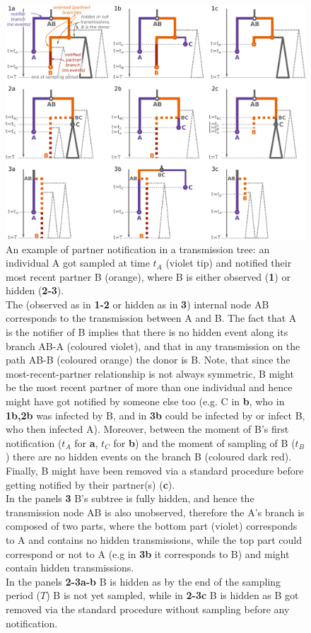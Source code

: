 \documentclass[a4paper,10pt]{article}
\begin{document}
\begin{figure}[tbhp]
\centering 
\includegraphics[width=1\textwidth]{Fig_PNbranches}
\caption{An example of partner notification in a transmission tree: an individual A got sampled at time $t_A$ (violet tip) and notified their most recent partner B (orange), where B is either observed (\textbf{1}) or hidden (\textbf{2-3}). \\
The (observed as in \textbf{1-2} or hidden as in \textbf{3}) internal node AB corresponds to the transmission between A and B. The fact that A is the notifier of B implies that there is no hidden event along its branch AB-A (coloured violet), and that in any transmission on the path AB-B (coloured orange) the donor is B. Note, that since the most-recent-partner relationship is not always symmetric, B might be the most recent partner of more than one individual and hence might have got notified by someone else too (e.g. C in \textbf{b}, who in \textbf{1b,2b} was infected by B, and in \textbf{3b} could be infected by or infect B, who then infected A). Moreover, between the moment of B's first notification ($t_A$ for \textbf{a}, $t_C$ for \textbf{b}) and the moment of sampling  of B ($t_B$) there are no hidden events on the branch B (coloured dark red). Finally, B might have been removed via a standard procedure before getting notified by their partner(s) (\textbf{c}).\\ 
In the panels \textbf{3} B's subtree is fully hidden, and hence the transmission node AB is also unobserved, therefore the A's branch is composed of two parts, where the bottom part (violet) corresponds to A and contains no hidden transmissions, while the top part could correspond or not to A (e.g in \textbf{3b} it corresponds to B) and might contain hidden transmissions. \\
In the panels \textbf{2-3a-b} B is hidden as by the end of the sampling period ($T$) B is not yet sampled, while in \textbf{2-3c} B is hidden as B got removed via the standard procedure without sampling before any notification.}
\label{fig:pn-branches} 
\end{figure}
\end{document}
